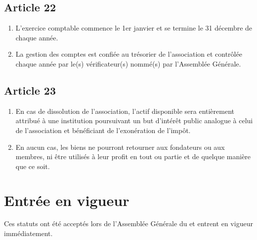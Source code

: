 \documentclass[12pt,twoside]{report}
\begin{document}
\subsection*{Article 22}
\begin{enumerate}
\item L'exercice comptable commence le 1er janvier et se termine le 31 décembre de chaque année.

\item La gestion des comptes est confiée au trésorier de l'association et contrôlée chaque année par le(s) vérificateur(s) nommé(s) par l'Assemblée Générale.
\end{enumerate}

\subsection*{Article 23}
\begin{enumerate}
\item En cas de dissolution de l'association, l'actif disponible sera entièrement attribué à une institution poursuivant un but d'intérêt public analogue à celui de l'association et bénéficiant de l’exonération de l’impôt.

\item En aucun cas, les biens ne pourront retourner aux fondateurs ou aux membres, ni être utilisés à leur profit en tout ou partie et de quelque manière que ce soit.
\end{enumerate}


\section*{Entrée en vigueur}
Ces statuts ont été acceptés lors de l’Assemblée Générale du \underline{\hspace{3cm}} et entrent en vigueur immédiatement.

\vspace{1.5cm}


\vspace{2cm}


\vspace{4cm}

\end{document}
